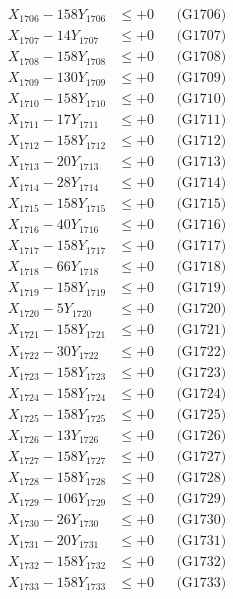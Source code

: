 \documentclass[a4paper,10pt]{article}
\begin{document}
{\begin{align}
X_{1706} - 158Y_{1706} &\leq +0 && \text{(G1706)} \\
X_{1707} - 14Y_{1707} &\leq +0 && \text{(G1707)} \\
X_{1708} - 158Y_{1708} &\leq +0 && \text{(G1708)} \\
X_{1709} - 130Y_{1709} &\leq +0 && \text{(G1709)} \\
X_{1710} - 158Y_{1710} &\leq +0 && \text{(G1710)} \\
\allowbreak
X_{1711} - 17Y_{1711} &\leq +0 && \text{(G1711)} \\
X_{1712} - 158Y_{1712} &\leq +0 && \text{(G1712)} \\
X_{1713} - 20Y_{1713} &\leq +0 && \text{(G1713)} \\
X_{1714} - 28Y_{1714} &\leq +0 && \text{(G1714)} \\
X_{1715} - 158Y_{1715} &\leq +0 && \text{(G1715)} \\
X_{1716} - 40Y_{1716} &\leq +0 && \text{(G1716)} \\
X_{1717} - 158Y_{1717} &\leq +0 && \text{(G1717)} \\
X_{1718} - 66Y_{1718} &\leq +0 && \text{(G1718)} \\
X_{1719} - 158Y_{1719} &\leq +0 && \text{(G1719)} \\
X_{1720} - 5Y_{1720} &\leq +0 && \text{(G1720)} \\
\allowbreak
X_{1721} - 158Y_{1721} &\leq +0 && \text{(G1721)} \\
X_{1722} - 30Y_{1722} &\leq +0 && \text{(G1722)} \\
X_{1723} - 158Y_{1723} &\leq +0 && \text{(G1723)} \\
X_{1724} - 158Y_{1724} &\leq +0 && \text{(G1724)} \\
X_{1725} - 158Y_{1725} &\leq +0 && \text{(G1725)} \\
X_{1726} - 13Y_{1726} &\leq +0 && \text{(G1726)} \\
X_{1727} - 158Y_{1727} &\leq +0 && \text{(G1727)} \\
X_{1728} - 158Y_{1728} &\leq +0 && \text{(G1728)} \\
X_{1729} - 106Y_{1729} &\leq +0 && \text{(G1729)} \\
X_{1730} - 26Y_{1730} &\leq +0 && \text{(G1730)} \\
\allowbreak
X_{1731} - 20Y_{1731} &\leq +0 && \text{(G1731)} \\
X_{1732} - 158Y_{1732} &\leq +0 && \text{(G1732)} \\
X_{1733} - 158Y_{1733} &\leq +0 && \text{(G1733)} \\

\end{align}}
\end{document}
